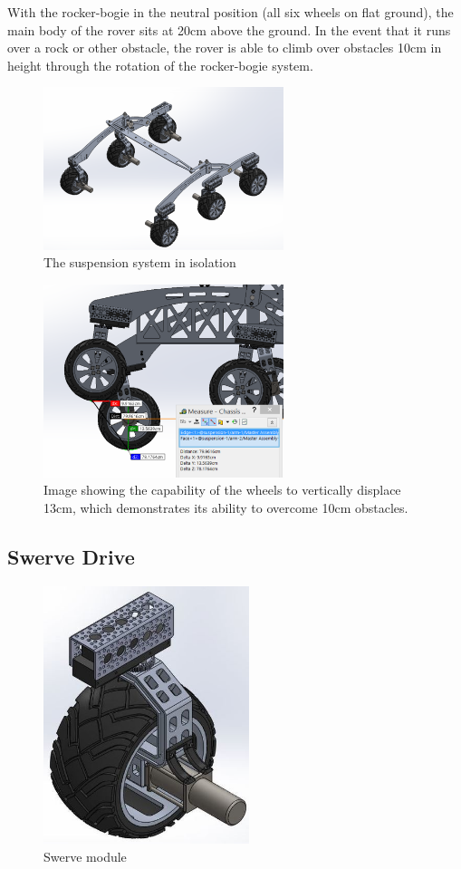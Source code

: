 \documentclass[titlepage,twocolumn,10pt]{article}
\begin{document}
    With the rocker-bogie in the neutral position (all six wheels on flat ground), the main body of the rover sits at 20cm above the ground. In the event that it runs over a rock or other obstacle, the rover is able to climb over obstacles 10cm in height through the rotation of the rocker-bogie system.

    \begin{figure}[H]
        \centering
        \includegraphics*[width = 7cm]{images/suspover.png}
        \caption{The suspension system in isolation}
    \end{figure}

    \begin{figure}[H]
        \centering
        \includegraphics*[width = 7cm]{images/suspdisp.png}
        \caption{Image showing the capability of the wheels to vertically displace 13cm, which demonstrates its ability to overcome 10cm obstacles.}
    \end{figure}

    \subsection{Swerve Drive}
    \begin{figure}[H]
        \centering
        \includegraphics*[width = 6cm]{images/swerve.jpg}
        \caption{Swerve module}
    \end{figure}
\end{document}
